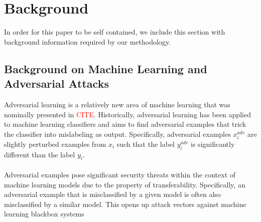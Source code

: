 \documentclass[letterpaper,twocolumn,10pt]{article}
\begin{document}
\section{Background}
In order for this paper to be self contained, we include this section with background information required by our methodology. 
\subsection{Background on Machine Learning and Adversarial Attacks} 
Adversarial learning is a relatively new area of machine learning that was nominally presented in \textcolor{red}{CITE}. Historically, adversarial learning has been applied to machine learning classifiers and aims to find adversarial examples that trick the classifier into mislabeling as output. Specifically, adversarial examples $x^{adv}_{i}$ are slightly perturbed examples from $x_{i}$ such that the label $y^{adv}_{i}$ is significantly different than the label $y_{i}$. 
\\
\\
Adversarial examples pose significant security threats within the context of machine learning models due to the property of transferability. Specifically, an adversarial example that is misclassified by a given model is often also misclassified by a similar model. This opens up attack vectors against machine learning blackbox systems 
\end{document}
